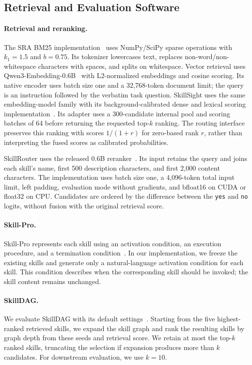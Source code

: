\subsection{Retrieval and Evaluation Software}
\label{app:implementation-software}
\paragraph{Retrieval and reranking.}
The SRA BM25 implementation~\citep{robertson2009bm25} uses NumPy/SciPy sparse operations with $k_1=1.5$ and $b=0.75$. Its tokenizer lowercases text, replaces non-word/non-whitespace characters with spaces, and splits on whitespace. Vector retrieval uses Qwen3-Embedding-0.6B~\citep{zhang2025qwen3embedding} with L2-normalized embeddings and cosine scoring. Its native encoder uses batch size one and a 32,768-token document limit; the query is an instruction followed by the verbatim task question. SkillSight uses the same embedding-model family with its background-calibrated dense and lexical scoring implementation~\citep{xiao2026skillsightcalibratinggenericcontent}. Its adapter uses a 300-candidate internal pool and scoring batches of 64 before returning the requested top-$k$ ranking. The routing interface preserves this ranking with scores $1/(1+r)$ for zero-based rank $r$, rather than interpreting the fused scores as calibrated probabilities.

SkillRouter uses the released 0.6B reranker~\citep{zheng2026skillrouter}. Its input retains the query and joins each skill's name, first 500 description characters, and first 2,000 content characters. The implementation uses batch size one, a 4,096-token total input limit, left padding, evaluation mode without gradients, and bfloat16 on CUDA or float32 on CPU. Candidates are ordered by the difference between the \texttt{yes} and \texttt{no} logits, without fusion with the original retrieval score.

\paragraph{Skill-Pro.}
Skill-Pro represents each skill using an activation condition, an execution procedure, and a termination condition~\citep{pmlr-v306-mi26d}. In our implementation, we freeze the existing skills and generate only a natural-language activation condition for each skill. This condition describes when the corresponding skill should be invoked; the skill content remains unchanged.

\paragraph{SkillDAG.}
We evaluate SkillDAG with its default settings~\citep{bai2026skilldag}. Starting from the five highest-ranked retrieved skills, we expand the skill graph and rank the resulting skills by graph depth from these seeds and retrieval score. We retain at most the top-$k$ ranked skills, truncating the selection if expansion produces more than $k$ candidates. For downstream evaluation, we use $k=10$.


